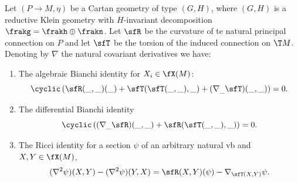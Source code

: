 \begin{cor}\label{cor 1.5.9 Cap}
    Let $(P\to M,\eta)$ be a Cartan geometry of type $(G,H)$, where $(G,H)$ is a reductive Klein geometry with $H$-invariant decomposition $\frakg=\frakh\oplus\frakn$. Let $\sfR$ be the curvature of te natural principal connection on $P$ and let $\sfT$ be the torsion of the induced connection on $\T M$. Denoting by $\nabla$ the natural covariant derivatives we have: 
    \begin{enumerate}[label=(\arabic*)]
        \item The algebraic Bianchi identity for $X_i\in\fX(M)$:
        \[\cyclic\left(\sfR(\_,\_)(\_)+\sfT(\sfT(\_,\_),\_)+(\nabla_{\_}\sfT)(\_,\_)\right)=0.\]
        \item The differential Bianchi identity 
        \[\cyclic\left((\nabla_{\_}\sfR)(\_,\_)+\sfR(\sfT(\_,\_),\_)\right)=0.\]
        \item The Ricci identity for a section $\psi$ of an arbitrary natural \gls{vb} and $X,Y\in\fX(M)$,
        \[(\nabla^2\psi)(X,Y)-(\nabla^2\psi)(Y,X)=\sfR(X,Y)(\psi)-\nabla_{\sfT(X,Y)}\psi.\]
    \end{enumerate}
\end{cor}
